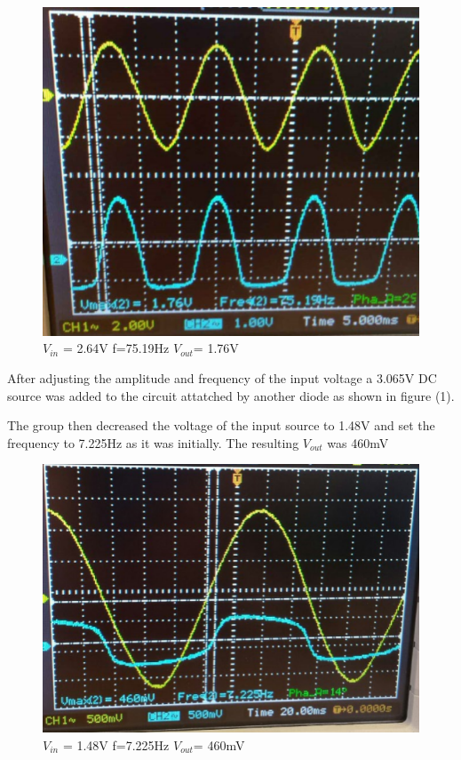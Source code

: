 \documentclass[twocolumn, amsmath]{revtex4}
\begin{document}
\begin{figure}
    \includegraphics[scale=0.3]{1760mV.png}  
    \caption{$V_{in}$ = 2.64V f=75.19Hz $V_{out}$= 1.76V}
\end{figure}


After adjusting the amplitude and frequency of the input voltage a 3.065V DC source was added to the circuit attatched by another diode as shown in figure (1). 

The group then decreased the voltage of the input source to 1.48V and set the frequency to 7.225Hz as it was initially. The resulting $V_{out}$ was 460mV

\begin{figure}
    \includegraphics[scale=0.3]{460mV.png}  
    \caption{$V_{in}$ = 1.48V f=7.225Hz $V_{out}$= 460mV}
\end{figure}
\end{document}
